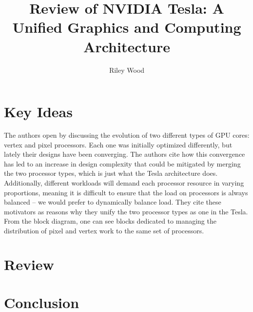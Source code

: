 \documentclass{article}
\title{Review of NVIDIA Tesla: A Unified Graphics and Computing Architecture \cite{Tesla}}
\author{Riley Wood}
\begin{document}
\maketitle


\section*{Key Ideas}
The authors open by discussing the evolution of two different types of GPU cores: vertex and pixel processors. Each one was initially optimized differently, but lately their designs have been converging. The authors cite how this convergence has led to an increase in design complexity that could be mitigated by merging the two processor types, which is just what the Tesla architecture does. Additionally, different workloads will demand each processor resource in varying proportions,
meaning it is difficult to ensure that the load on processors is always balanced -- we would prefer to dynamically balance load. They cite these motivators as reasons why they unify the two processor types as one in the Tesla. From the block diagram, one can see blocks dedicated to managing the distribution of pixel and vertex work to the same set of processors.

\section*{Review}


\section*{Conclusion}





\end{document}
